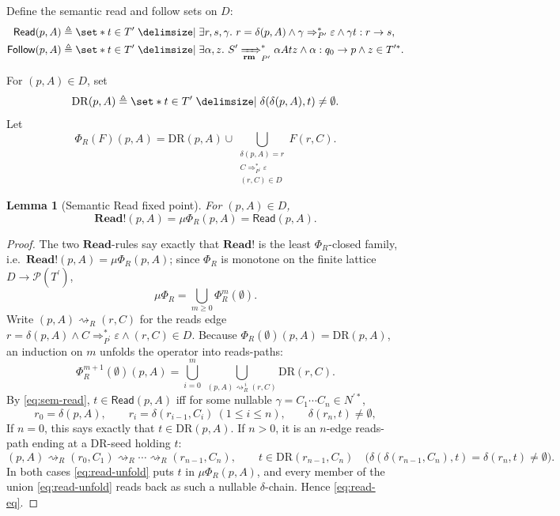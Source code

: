 \documentclass[11pt,a4paper]{article}
\theoremstyle{prettyplain}
\newtheorem{lemma}[theorem]{Lemma}
\theoremstyle{prettydef}
\def\mid{\;\delimsize\vert\;}#1%
\newcommand{\Pow}{\ensuremath{\mathcal P}}
\newcommand{\eps}{\varepsilon}
\newcommand{\RMP}{\xRightarrow[\mathbf{rm}]{}_{P^\prime}}
\newcommand{\Path}[3]{#1:#2\to#3}
\newcommand{\Read}{\mathbf{Read}}
\begin{document}
Define the semantic read and follow sets on \(D\):
\begin{align}
\mathsf{Read}(p,A)
&\triangleq
\set*{t\in T^\prime
\mid
\exists r,s,\gamma.\ 
r=\delta(p,A)
\land
\gamma\Rightarrow_{P^\prime}^*\eps
\land
\gamma t:r\to s}, \label{eq:sem-read}\\
\mathsf{Follow}(p,A)
&\triangleq
\set*{t\in T^\prime
\mid
\exists\alpha,z.\ 
S^\prime\RMP^*\alpha A t z
\land
\Path{\alpha}{q_0}{p}
\land
z\in T^{\prime *}}. \label{eq:sem-follow}
\end{align}

For \((p,A)\in D\), set
\[
\mathrm{DR}(p,A)
\triangleq
\set*{t\in T^\prime\mid \delta(\delta(p,A),t)\ne\emptyset}.
\]
Let
\[
\Phi_R(F)(p,A)
=
\mathrm{DR}(p,A)
\cup
\bigcup_{\substack{\delta(p,A)=r\\ C\Rightarrow_{P^\prime}^*\eps\\(r,C)\in D}}
F(r,C).
\]

\begin{lemma}[Semantic Read fixed point]\label{lem:read-fixed-point}
For \((p,A)\in D\),
\begin{equation}\label{eq:read-eq}
\Read\mathbin{!}(p,A)
=
\mu\Phi_R(p,A)
=
\mathsf{Read}(p,A).
\end{equation}
\end{lemma}

\begin{proof}
The two \(\Read\)-rules say exactly that \(\Read\mathbin{!}\) is the least
\(\Phi_R\)-closed family, i.e.\ \(\Read\mathbin{!}(p,A)=\mu\Phi_R(p,A)\); since
\(\Phi_R\) is monotone on the finite lattice \(D\to\Pow(T^\prime)\),
\[
\mu\Phi_R=\bigcup_{m\ge 0}\Phi_R^{m}(\emptyset).
\]
Write \((p,A)\rightsquigarrow_R(r,C)\) for the reads edge
\(r=\delta(p,A)\land C\Rightarrow_{P^\prime}^*\eps\land(r,C)\in D\).  Because
\(\Phi_R(\emptyset)(p,A)=\mathrm{DR}(p,A)\), an induction on \(m\) unfolds the
operator into reads-paths:
\begin{equation}\label{eq:read-unfold}
\Phi_R^{m+1}(\emptyset)(p,A)
=\bigcup_{i=0}^{m}\
\bigcup_{(p,A)\rightsquigarrow_R^{\,i}(r,C)}
\mathrm{DR}(r,C).
\end{equation}
By \eqref{eq:sem-read}, \(t\in\mathsf{Read}(p,A)\) iff for some nullable
\(\gamma=C_1\cdots C_n\in N^{\prime *}\),
\[
r_0=\delta(p,A),\qquad
r_i=\delta(r_{i-1},C_i)\ (1\le i\le n),\qquad
\delta(r_n,t)\ne\emptyset ,
\]
If \(n=0\), this says exactly that \(t\in\mathrm{DR}(p,A)\).  If \(n>0\), it is
an \(n\)-edge reads-path ending at a \(\mathrm{DR}\)-seed holding \(t\):
\[
(p,A)\rightsquigarrow_R(r_0,C_1)\rightsquigarrow_R\cdots\rightsquigarrow_R
(r_{n-1},C_n),
\qquad
t\in\mathrm{DR}(r_{n-1},C_n)
\quad\bigl(\delta(\delta(r_{n-1},C_n),t)=\delta(r_n,t)\ne\emptyset\bigr).
\]
In both cases \eqref{eq:read-unfold} puts
\(t\) in \(\mu\Phi_R(p,A)\), and every member of the union
\eqref{eq:read-unfold} reads back as such a nullable \(\delta\)-chain.  Hence
\eqref{eq:read-eq}.
\end{proof}
\end{document}
